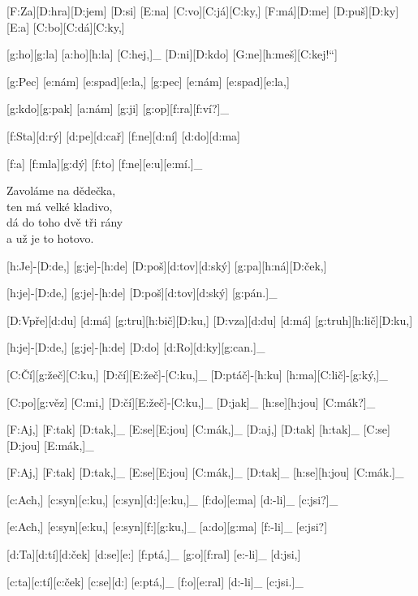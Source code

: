 [F:Za][D:hra][D:jem] [D:si] [E:na] [C:vo][C:já][C:ky,] %
[F:má][D:me] [D:puš][D:ky] [E:a] [C:bo][C:dá][C:ky,]

[g:ho][g:la] [a:ho][h:la] [C:hej,]_
[D:ni][D:kdo] [G:ne][h:meš][C:kej!“]



{\minw=6mm
[g:Pec] [e:nám] [e:spad][e:la,] %
[g:pec] [e:nám] [e:spad][e:la,]

[g:kdo][g:pak] [a:nám] [g:ji] [g:op][f:ra][f:ví?]_

[f:Sta][d:rý] [d:pe][d:cař] [f:ne][d:ní] [d:do][d:ma]

[f:a] [f:mla][g:dý] [f:to] [f:ne][e:u][e:mí.]_
}

Zavoláme na dědečka,\\
ten má velké kladivo,\\
dá do toho dvě tři rány\\
a už je to hotovo.



[h:Je]-[D:de,] [g:je]-[h:de] [D:poš][d:tov][d:ský] [g:pa][h:ná][D:ček,] %

[h:je]-[D:de,] [g:je]-[h:de] [D:poš][d:tov][d:ský] [g:pán.]_

[D:Vpře][d:du] [d:má] [g:tru][h:bič][D:ku,] %
[D:vza][d:du] [d:má] [g:truh][h:lič][D:ku,]

[h:je]-[D:de,] [g:je]-[h:de] [D:do] [d:Ro][d:ky][g:can.]_



[C:Čí][g:žeč][C:ku,] [D:čí][E:žeč]-[C:ku,]_
[D:ptáč]-[h:ku] [h:ma][C:lič]-[g:ký,]_

[C:po][g:věz] [C:mi,] [D:čí][E:žeč]-[C:ku,]_
[D:jak]_ [h:se][h:jou] [C:mák?]_

[F:Aj,] [F:tak] [D:tak,]_ [E:se][E:jou] [C:mák,]_
[D:aj,] [D:tak] [h:tak]_ [C:se][D:jou] [E:mák,]_

[F:Aj,] [F:tak] [D:tak,]_ [E:se][E:jou] [C:mák,]_
[D:tak]_ [h:se][h:jou] [C:mák.]_



[c:Ach,] [c:syn][c:ku,] [c:syn][d:][e:ku,]_ [f:do][e:ma] [d:-li]_ [c:jsi?]_

[e:Ach,] [e:syn][e:ku,] [e:syn][f:][g:ku,]_ [a:do][g:ma] [f:-li]_ [e:jsi?] %

[d:Ta][d:tí][d:ček] [d:se][e:] [f:ptá,]_ [g:o][f:ral] [e:-li]_ [d:jsi,] %

[c:ta][c:tí][c:ček] [c:se][d:] [e:ptá,]_ [f:o][e:ral] [d:-li]_ [c:jsi.]_

